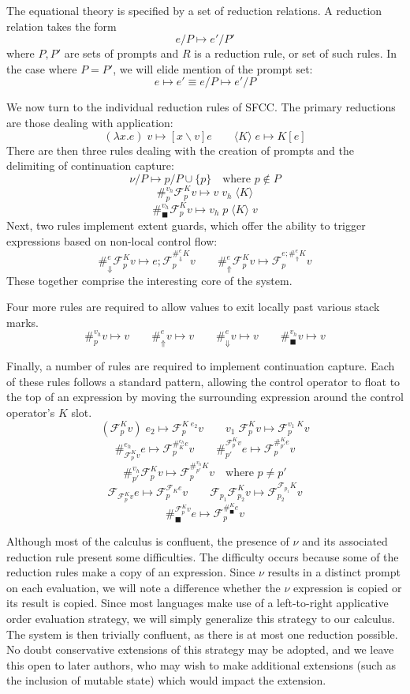 \documentclass[11pt]{article}
\newcommand\x{\lambda x}
\newcommand\F{\mathcal{F}}
\newcommand{\angles}[1]{\langle#1\rangle}
\begin{document}
The equational theory is specified by a set of reduction relations.
A reduction relation takes the form
$$e/P \mapsto e'/P'$$
where $P, P'$ are sets of prompts and $R$ is a reduction rule, or set of such rules.
In the case where $P = P'$, we will elide mention of the prompt set:
$$e \mapsto e' \equiv e/P \mapsto e'/P$$


We now turn to the individual reduction rules of SFCC.
The primary reductions are those dealing with application:
$$(\x.e)\;v \mapsto [x \backslash v]e \qquad
  \angles{K}\;e \mapsto K[e]$$
There are then three rules dealing with the creation of prompts and the delimiting of continuation capture:
$$\nu/P \mapsto p/P\cup\{p\} \quad\textrm{where }p \notin P$$
$$\#_p^{v_h}\F_p^Kv \mapsto v\;v_h\;\angles K$$
$$\#_\blacksquare^{v_h}\F_p^K v \mapsto v_h\;p\;\angles{K}\;v$$
Next, two rules implement extent guards, which offer the ability to trigger expressions based on non-local control flow:
$$\#_{\Downarrow}^{e}\F_p^K v \mapsto e;\F_p^{\#_\Downarrow^{e}K}v \qquad
  \#_{\Uparrow}^{e}\F_p^K v \mapsto \F_p^{e;\#_\Uparrow^{e}K}v$$
These together comprise the interesting core of the system.

Four more rules are required to allow values to exit locally past various stack marks.
$$\#_p^{v_h} v \mapsto v \qquad
  \#_{\Uparrow}^{e}v \mapsto v \qquad
  \#_{\Downarrow}^{e}v \mapsto v \qquad
  \#_\blacksquare^{v_h}v \mapsto v$$

Finally, a number of rules are required to implement continuation capture.
Each of these rules follows a standard pattern, allowing the control operator to float to the top of an expression by moving the surrounding expression around the control operator's $K$ slot.
$$(\F^K_pv)\;e_2 \mapsto \F^{K\;e_2}_pv \qquad
  v_1\;\F^K_pv \mapsto \F^{v_1\;K}_pv$$
$$\#_{\F_p^Kv}^{e_h}e \mapsto \F_p^{\#_K^{e_h}e}v \qquad
  \#^{\F_p^Kv}_{p'}e \mapsto \F_p^{\#^K_{p'}e}v$$
$$\#_{p'}^{v_h}\F^K_pv \mapsto \F^{\#_{p'}^{v_h}K}_pv
  	\quad\textrm{where }p \neq p'$$
$$\F_{\F^K_pv}e \mapsto \F^{\F_Ke}_pv \qquad
  \F_{p_1}\F^K_{p_2}v \mapsto \F^{\F_{p_1}K}_{p_2}v$$
$$\#_\blacksquare^{\F_p^K v}e \mapsto \F_p^{\#_\blacksquare^K e}v$$

Although most of the calculus is confluent, the presence of $\nu$ and its associated reduction rule present some difficulties.
The difficulty occurs because some of the reduction rules make a copy of an expression.
Since $\nu$ results in a distinct prompt on each evaluation, we will note a difference whether the $\nu$ expression is copied or its result is copied.
Since most languages make use of a left-to-right applicative order evaluation strategy, we will simply generalize this strategy to our calculus.
The system is then trivially confluent, as there is at most one reduction possible.
No doubt conservative extensions of this strategy may be adopted, and we leave this open to later authors, who may wish to make additional extensions (such as the inclusion of mutable state) which would impact the extension.
\end{document}
